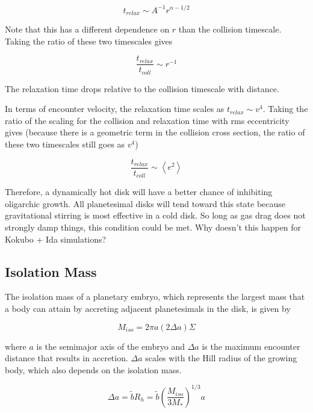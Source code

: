 \documentclass[onecolumn]{aastex63}
\begin{document}
\begin{equation}
    t_{relax} \sim A^{-1} r^{\alpha - 1/2}
\end{equation}

Note that this has a different dependence on $r$ than the collision timescale. Taking the ratio of these two timescales gives

\begin{equation}
    \frac{t_{relax}}{t_{coll}} \sim r^{-1}
\end{equation}

The relaxation time drops relative to the collision timescale with distance.

In terms of encounter velocity, the relaxation time scales as $t_{relax} \sim v^{4}$. Taking the ratio of the scaling for the collision and relaxation time with rms eccentricity gives (because there is a geometric term in the collision cross section, the ratio of these two timescales still goes as $v^{4}$)

\begin{equation}
    \frac{t_{relax}}{t_{coll}} \sim \left< e^{2} \right>
\end{equation}

Therefore, a dynamically hot disk will have a better chance of inhibiting oligarchic growth. All planetesimal disks will tend toward this state because gravitational stirring is most effective in a cold disk. So long as gas drag does not strongly damp things, this condition could be met. Why doesn't this happen for Kokubo + Ida simulations?

\subsection{Isolation Mass}

The isolation mass of a planetary embryo, which represents the largest mass that a body can attain by accreting adjacent planetesimals in the disk, is given by

\begin{equation}
    M_{iso} = 2 \pi a \left( 2 \Delta a \right) \Sigma
\end{equation}

\noindent where $a$ is the semimajor axis of the embryo and $\Delta a$ is the maximum encounter distance that results in accretion. $\Delta a$ scales with the Hill radius of the growing body, which also depends on the isolation mass.

\begin{equation}
    \Delta a = \tilde{b} R_{h} = \tilde{b} \left( \frac{M_{iso}}{3 M_{*}} \right)^{1/3} a
\end{equation}
\end{document}
